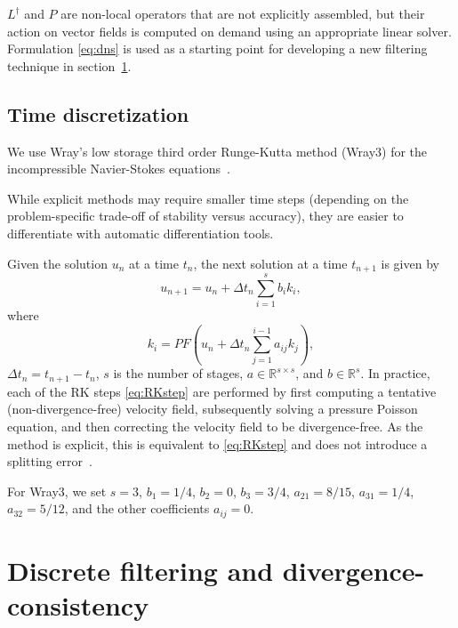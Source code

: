 \documentclass[preprint]{elsarticle}
\newcommand{\R}[1]{}
\newcommand{\revboth}[1]{#1}
\begin{document}
$L^\dagger$ and $P$ are non-local operators that are not explicitly
assembled, but their action on vector fields is computed on demand using an
appropriate linear solver. Formulation \eqref{eq:dns} is used as a starting
point for developing a new filtering technique in section~\ref{sec:filter}.

\subsection{Time discretization} \label{sec:RK}

\revboth{
    \R{Wray3}
    
    We use Wray's low storage third order Runge-Kutta method (Wray3) for the
    incompressible Navier-Stokes equations~\cite{Wray1990,Sanderse2013}.
}
While explicit
methods may require smaller time steps (depending on the problem-specific
trade-off of stability versus accuracy), they are easier to differentiate with
automatic differentiation tools.

Given the solution $u_n$ at a time $t_n$, the next solution at a time $t_{n +
1}$ is given by
\begin{equation}
    u_{n + 1} = u_{n} + \Delta t_{n} \sum_{i = 1}^{s} b_{i} k_i,
\end{equation}
where
\begin{equation} \label{eq:RKstep}
    k_i = P F \left(u_n + \Delta t_{n} \sum_{j = 1}^{i - 1} a_{i j} k_j \right),
\end{equation}
$\Delta t_n = t_{n + 1} - t_n$, $s$ is the number of stages, $a \in
\mathbb{R}^{s \times s}$, and $b \in \mathbb{R}^s$.
In practice, each of the RK steps \eqref{eq:RKstep} are performed by first
computing a tentative (non-divergence-free) velocity field, subsequently solving
a pressure Poisson equation, and then correcting the velocity field to be
divergence-free. As the method is explicit, this is equivalent to
\eqref{eq:RKstep} and does not introduce a splitting error~\cite{Sanderse2013}.
\revboth{
    
    For Wray3, we set
    $s = 3$,
    $b_1 = 1 / 4$,
    $b_2 = 0$,
    $b_3 = 3 / 4$,
    $a_{2 1} = 8 / 15$,
    $a_{3 1} = 1 / 4$,
    $a_{3 2} = 5 / 12$,
    and the other coefficients
    $a_{i j} = 0$.
}

\section{Discrete filtering and divergence-consistency} \label{sec:filter}
\end{document}
